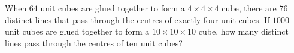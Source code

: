 When $64$ unit cubes are glued together to form a $4\times4\times4$ cube, there are $76$ distinct lines that pass through the centres of exactly four unit cubes. If $1000$ unit cubes are glued together to form a $10\times10\times10$ cube, how many distinct lines pass through the centres of ten unit cubes?
